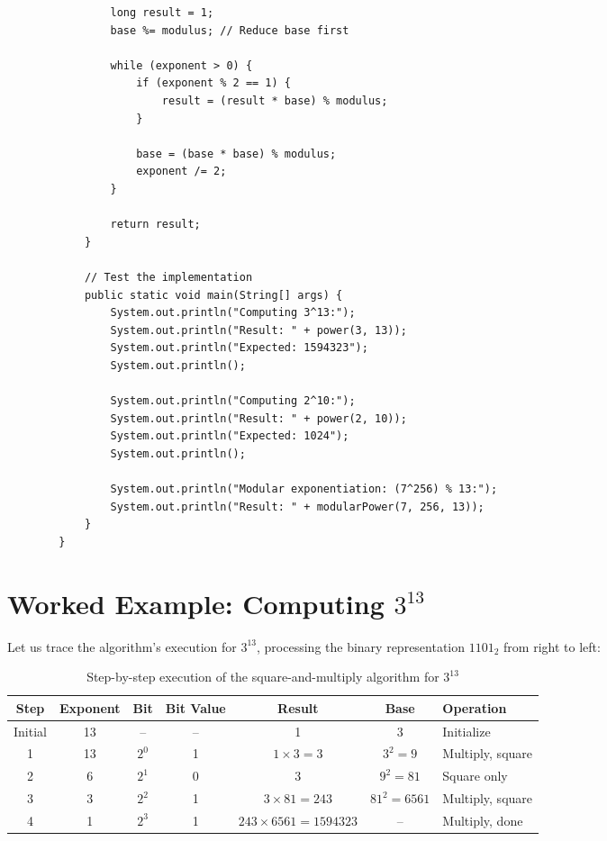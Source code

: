 \documentclass{article}
\begin{document}
\begin{lstlisting}
				long result = 1;
				base %= modulus; // Reduce base first
				
				while (exponent > 0) {
					if (exponent % 2 == 1) {
						result = (result * base) % modulus;
					}
					
					base = (base * base) % modulus;
					exponent /= 2;
				}
				
				return result;
			}
			
			// Test the implementation
			public static void main(String[] args) {
				System.out.println("Computing 3^13:");
				System.out.println("Result: " + power(3, 13));
				System.out.println("Expected: 1594323");
				System.out.println();
				
				System.out.println("Computing 2^10:");
				System.out.println("Result: " + power(2, 10));
				System.out.println("Expected: 1024");
				System.out.println();
				
				System.out.println("Modular exponentiation: (7^256) % 13:");
				System.out.println("Result: " + modularPower(7, 256, 13));
			}
		}
	\end{lstlisting}
	
	\section{Worked Example: Computing $3^{13}$}
	
	Let us trace the algorithm's execution for $3^{13}$, processing the binary representation $1101_2$ from right to left:
	
	\begin{table}[h]
		\centering
		\begin{tabular}{ccccccl}
			\toprule
			\textbf{Step} & \textbf{Exponent} & \textbf{Bit} & \textbf{Bit Value} & \textbf{Result} & \textbf{Base} & \textbf{Operation} \\
			\midrule
			Initial & 13 & -- & -- & 1 & 3 & Initialize \\
			1 & 13 & $2^0$ & 1 & $1 \times 3 = 3$ & $3^2 = 9$ & Multiply, square \\
			2 & 6 & $2^1$ & 0 & 3 & $9^2 = 81$ & Square only \\
			3 & 3 & $2^2$ & 1 & $3 \times 81 = 243$ & $81^2 = 6561$ & Multiply, square \\
			4 & 1 & $2^3$ & 1 & $243 \times 6561 = 1594323$ & -- & Multiply, done \\
			\bottomrule
		\end{tabular}
		\caption{Step-by-step execution of the square-and-multiply algorithm for $3^{13}$}
	\end{table}
	
\end{document}
